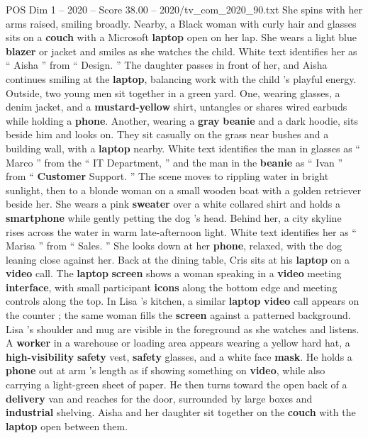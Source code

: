 \begin{textsample}{POS Dim 1 – 2020 – Score 38.00 – 2020/tv\_com\_2020\_90.txt}
She spins with her arms raised, smiling broadly.
Nearby, a Black woman with curly hair and glasses sits on a \textbf{couch} with a Microsoft \textbf{laptop} open on her lap.
She wears a light blue \textbf{blazer} or jacket and smiles as she watches the child.
White text identifies her as “ Aisha ” from “ Design. ” The daughter passes in front of her, and Aisha continues smiling at the \textbf{laptop}, balancing work with the child ’s playful energy.
Outside, two young men sit together in a green yard.
One, wearing glasses, a denim jacket, and a \textbf{mustard-yellow} shirt, untangles or shares wired earbuds while holding a \textbf{phone}.
Another, wearing a \textbf{gray} \textbf{beanie} and a dark hoodie, sits beside him and looks on.
They sit casually on the grass near bushes and a building wall, with a \textbf{laptop} nearby.
White text identifies the man in glasses as “ Marco ” from the “ IT Department, ” and the man in the \textbf{beanie} as “ Ivan ” from “ \textbf{Customer} Support. ” The scene moves to rippling water in bright sunlight, then to a blonde woman on a small wooden boat with a golden retriever beside her.
She wears a pink \textbf{sweater} over a white collared shirt and holds a \textbf{smartphone} while gently petting the dog ’s head.
Behind her, a city skyline rises across the water in warm late-afternoon light.
White text identifies her as “ Marisa ” from “ Sales. ” She looks down at her \textbf{phone}, relaxed, with the dog leaning close against her.
Back at the dining table, Cris sits at his \textbf{laptop} on a \textbf{video} call.
The \textbf{laptop} \textbf{screen} shows a woman speaking in a \textbf{video} meeting \textbf{interface}, with small participant \textbf{icons} along the bottom edge and meeting controls along the top.
In Lisa ’s kitchen, a similar \textbf{laptop} \textbf{video} call appears on the counter ; the same woman fills the \textbf{screen} against a patterned background.
Lisa ’s shoulder and mug are visible in the foreground as she watches and listens.
A \textbf{worker} in a warehouse or loading area appears wearing a yellow hard hat, a \textbf{high-visibility} \textbf{safety} vest, \textbf{safety} glasses, and a white face \textbf{mask}.
He holds a \textbf{phone} out at arm ’s length as if showing something on \textbf{video}, while also carrying a light-green sheet of paper.
He then turns toward the open back of a \textbf{delivery} van and reaches for the door, surrounded by large boxes and \textbf{industrial} shelving.
Aisha and her daughter sit together on the \textbf{couch} with the \textbf{laptop} open between them.

\end{textsample}
